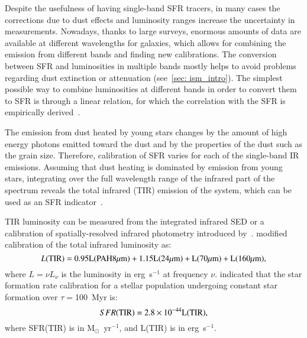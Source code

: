 Despite the usefulness of having single-band SFR tracers, in many cases the corrections due to dust effects and luminosity ranges increase the uncertainty in measurements.
Nowadays, thanks to large surveys, enormous amounts of data are available at different wavelengths for galaxies, which allows for combining the emission from different bands and finding new calibrations.
The conversion between SFR and luminosities in multiple bands mostly helps to avoid problems regarding dust extinction or attenuation (see~\ref{sec: ism_intro}). 
The simplest possible way to combine luminosities at different bands in order to convert them to SFR is through a linear relation, for which the correlation with the SFR is empirically derived~\citep{Kennicutt12}.

The emission from dust heated by young stars changes by the amount of high energy photons emitted toward the dust and by the properties of the dust such as the grain size.
Therefore, calibration of SFR varies for each of the single-band IR emissions.
Assuming that dust heating is dominated by emission from young stars, integrating over the full wavelength range of the infrared part of the spectrum reveals the total infrared (TIR) emission of the system, which can be used as an SFR indicator~\citep{Kennicutt98b}. 
 
TIR luminosity can be measured from the integrated infrared SED or a calibration of spatially-resolved infrared photometry introduced by~\cite{Draine07}. 
\cite{Boquien10} modified calibration of the total infrared luminosity as: 
\begin{equation}
L(\rm TIR) = 0.95L(PAH 8 \mu m) + 1.15L(24 \mu m) + L(70 \mu m) + L(160 \mu m),
\end{equation}
where $L = \nu L_{\nu}$ is the luminosity in erg~s$^{-1}$ at frequency $\nu$. 
\cite{Calzetti07} indicated that the star formation rate calibration for a stellar population undergoing constant star formation over $\tau=$100~Myr is:
\begin{equation}
\label{sfr_tot_IR}
SFR(\rm TIR) = 2.8 \times10^{-44}L(\rm TIR),
\end{equation}
where SFR(TIR) is in M$_{\odot}$~yr$^{-1}$, and L(TIR) is in erg~s$^{-1}$. 


